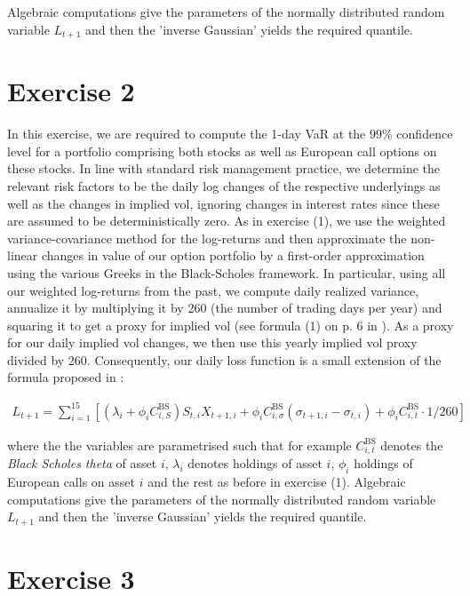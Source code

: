 \documentclass[10pt,a4paper]{article}
\theoremstyle{definition}
\begin{document}
	Algebraic computations give the parameters of the normally distributed random variable $L_{t+1}$ and then the 'inverse Gaussian' yields the required quantile.
	
	
	\section*{Exercise 2}
	
	In this exercise, we are required to compute the 1-day VaR at the $99\%$ confidence level for a portfolio comprising both stocks as well as European call options on these stocks. In line with standard risk management practice, we determine the relevant risk factors to be the daily log changes of the respective underlyings as well as the changes in implied vol, ignoring changes in interest rates since these are assumed to be deterministically zero. As in exercise (1), we use the weighted variance-covariance method for the log-returns and then approximate the non-linear changes in value of our option portfolio by a first-order approximation using the various Greeks in the Black-Scholes framework. In particular, using all our weighted log-returns from the past, we compute daily realized variance, annualize it by multiplying it by 260 (the number of trading days per year) and squaring it to get a proxy for implied vol (see formula (1) on  p. 6 in \cite{EG06}). As a proxy for our daily implied vol changes, we then use this yearly implied vol proxy divided by 260. Consequently, our daily loss function is a small extension of the formula proposed in \cite{QRM}:
	
	\begin{align*}
	L_{t+1} = \sum_{i=1}^{15} \left[(\lambda_i + \phi_i C^{\text{BS}}_{i,S})  S_{t,i} X_{t+1,i} + \phi_i C^{\text{BS}}_{i, \sigma} (\sigma_{t+1,i} - \sigma_{t,i}) + \phi_i C^{\text{BS}}_{i,t} \cdot 1/260 \right]
	\end{align*}
	
	where the the variables are parametrised such that for example $C^{\text{BS}}_{i,t}$ denotes the \emph{Black Scholes theta} of asset $i$, $\lambda_i$ denotes holdings of asset $i$, $\phi_i$ holdings of European calls on asset $i$ and the rest as before in exercise (1). Algebraic computations give the parameters of the normally distributed random variable $L_{t+1}$ and then the 'inverse Gaussian' yields the required quantile.
	
	
	\section*{Exercise 3}
	
\end{document}
